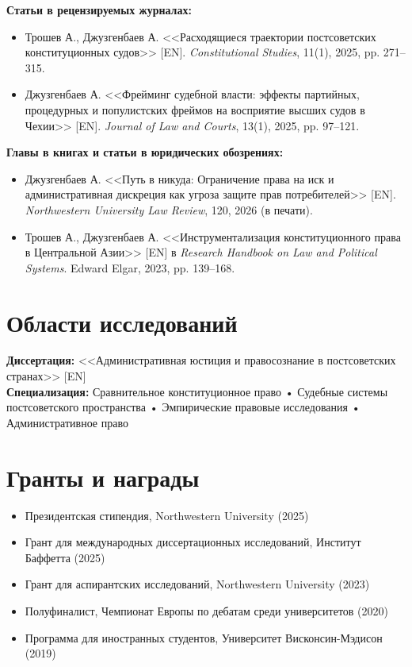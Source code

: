 \documentclass[10pt,a4paper]{article}
\begin{document}
\textbf{Статьи в рецензируемых журналах:}
\begin{itemize}
    \item Трошев А., Джузгенбаев А. <<Расходящиеся траектории постсоветских конституционных судов>> [EN]. \textit{Constitutional Studies}, 11(1), 2025, pp. 271--315.
    \item Джузгенбаев А. <<Фрейминг судебной власти: эффекты партийных, процедурных и популистских фреймов на восприятие высших судов в Чехии>> [EN]. \textit{Journal of Law and Courts}, 13(1), 2025, pp. 97--121.
\end{itemize}

\textbf{Главы в книгах и статьи в юридических обозрениях:}
\begin{itemize}
    \item Джузгенбаев А. <<Путь в никуда: Ограничение права на иск и административная дискреция как угроза защите прав потребителей>> [EN]. \textit{Northwestern University Law Review}, 120, 2026 (в печати).
    \item Трошев А., Джузгенбаев А. <<Инструментализация конституционного права в Центральной Азии>> [EN] в \textit{Research Handbook on Law and Political Systems}. Edward Elgar, 2023, pp. 139--168.
\end{itemize}

\section{Области исследований}

\textbf{Диссертация:} <<Административная юстиция и правосознание в постсоветских странах>> [EN] \\
\textbf{Специализация:} Сравнительное конституционное право • Судебные системы постсоветского пространства • Эмпирические правовые исследования • Административное право

\section{Гранты и награды}

\begin{itemize}
    \item Президентская стипендия, Northwestern University (2025)
    \item Грант для международных диссертационных исследований, Институт Баффетта (2025)
    \item Грант для аспирантских исследований, Northwestern University (2023)
    \item Полуфиналист, Чемпионат Европы по дебатам среди университетов (2020)
    \item Программа для иностранных студентов, Университет Висконсин-Мэдисон (2019)
\end{itemize}
\end{document}
